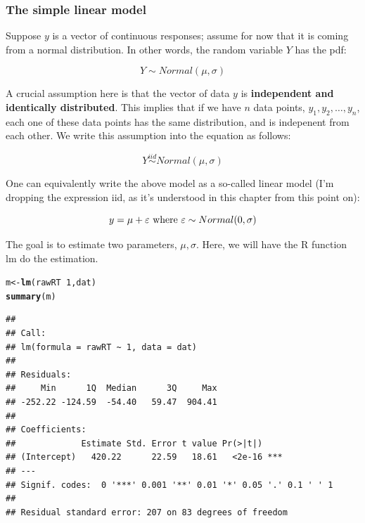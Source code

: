 \documentclass[12pt]{book}\usepackage[]{graphicx}\usepackage[]{color}
\makeatletter
\newcommand{\hlnum}[1]{\textcolor[rgb]{0.686,0.059,0.569}{#1}}%
\newcommand{\hlopt}[1]{\textcolor[rgb]{0,0,0}{#1}}%
\newcommand{\hlstd}[1]{\textcolor[rgb]{0.345,0.345,0.345}{#1}}%
\newcommand{\hlkwb}[1]{\textcolor[rgb]{0.69,0.353,0.396}{#1}}%
\newcommand{\hlkwd}[1]{\textcolor[rgb]{0.737,0.353,0.396}{\textbf{#1}}}%
\newenvironment{kframe}{%
 \def\at@end@of@kframe{}%
 \ifinner\ifhmode%
  \def\at@end@of@kframe{\end{minipage}}%
  \begin{minipage}{\columnwidth}%
 \fi\fi%
 \def\FrameCommand##1{\hskip\@totalleftmargin \hskip-\fboxsep
 \colorbox{shadecolor}{##1}\hskip-\fboxsep
     \hskip-\linewidth \hskip-\@totalleftmargin \hskip\columnwidth}%
 \MakeFramed {\advance\hsize-\width
   \@totalleftmargin\z@ \linewidth\hsize
   \@setminipage}}%
 {\par\unskip\endMakeFramed%
 \at@end@of@kframe}
\newenvironment{knitrout}{}{} %
\makeatother
\begin{document}
\subsubsection{The simple linear model}

Suppose $y$ is a vector of continuous responses; assume for now that it is coming from a normal distribution. In other words, the random variable $Y$ has the pdf:

\begin{equation}
Y \sim Normal(\mu,\sigma)
\end{equation}

A crucial assumption here is that the vector of data $y$ is \textbf{independent and identically distributed}. This implies that if we have $n$ data points, $y_1,y_2,\dots,y_n$, each one of these data points has the same distribution, and is indepenent from each other. We write this assumption into the equation as follows:

\begin{equation}
Y \overset{iid}{\sim} Normal(\mu,\sigma)
\end{equation}



One can equivalently write the above model as a so-called linear model (I'm dropping the expression iid, as it's understood in this chapter from this point on):

\begin{equation}
y = \mu + \varepsilon \hbox{ where } \varepsilon \sim Normal(0,\sigma)
\end{equation}

The goal is to estimate two parameters, $\mu,\sigma$. 
Here, we will have the R function lm do the estimation.

\begin{knitrout}
\color{fgcolor}\begin{kframe}
\begin{alltt}
\hlstd{m}\hlkwb{<-}\hlkwd{lm}\hlstd{(rawRT}\hlopt{~}\hlnum{1}\hlstd{,dat)}
\hlkwd{summary}\hlstd{(m)}
\end{alltt}
\begin{verbatim}
## 
## Call:
## lm(formula = rawRT ~ 1, data = dat)
## 
## Residuals:
##     Min      1Q  Median      3Q     Max 
## -252.22 -124.59  -54.40   59.47  904.41 
## 
## Coefficients:
##             Estimate Std. Error t value Pr(>|t|)    
## (Intercept)   420.22      22.59   18.61   <2e-16 ***
## ---
## Signif. codes:  0 '***' 0.001 '**' 0.01 '*' 0.05 '.' 0.1 ' ' 1
## 
## Residual standard error: 207 on 83 degrees of freedom
\end{verbatim}
\end{kframe}
\end{knitrout}
\end{document}

